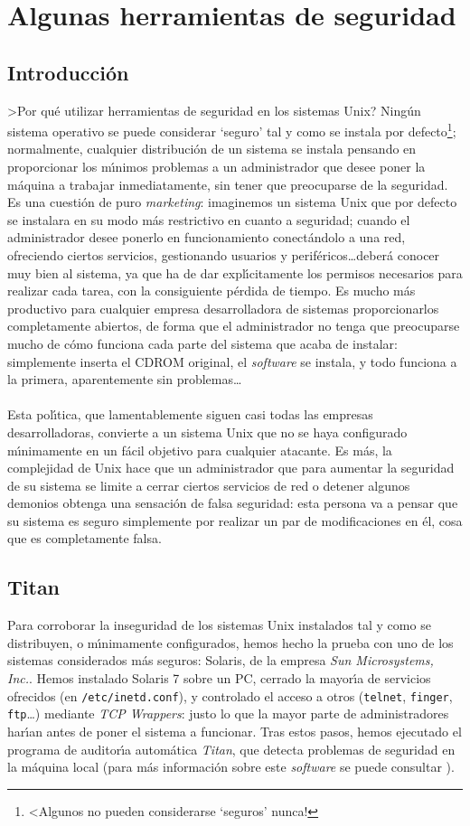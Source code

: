 \chapter{Algunas herramientas de seguridad}
\section{Introducci\'on}
>Por qu\'e utilizar herramientas de seguridad en los sistemas Unix? Ning\'un
sistema operativo se puede considerar `seguro' tal y como se instala por 
defecto\footnote{<Algunos no pueden considerarse `seguros' nunca!}; 
normalmente, cualquier distribuci\'on de un sistema se instala pensando en
proporcionar los m\'{\i}nimos problemas a un administrador que desee poner
la m\'aquina a trabajar inmediatamente, sin tener que preocuparse de la 
seguridad. Es una cuesti\'on de puro {\it marketing}: imaginemos un sistema
Unix que por defecto se instalara en su modo m\'as restrictivo en cuanto a
seguridad; cuando el administrador desee ponerlo en funcionamiento 
conect\'andolo a una red, ofreciendo ciertos servicios, gestionando usuarios y 
perif\'ericos\ldots deber\'a conocer muy bien al sistema, ya que ha de dar
expl\'{\i}citamente los permisos necesarios para realizar cada tarea, con la 
consiguiente p\'erdida de tiempo. Es mucho m\'as productivo para cualquier
empresa desarrolladora de sistemas proporcionarlos completamente abiertos, de 
forma que el administrador no tenga que preocuparse mucho de c\'omo funciona 
cada parte del sistema que acaba de instalar: simplemente inserta el CDROM 
original, el {\it software} se instala, y todo funciona a la primera, 
aparentemente sin problemas\ldots\\
\\Esta pol\'{\i}tica, que lamentablemente siguen casi todas las empresas 
desarrolladoras, convierte a un sistema Unix que no se haya configurado 
m\'{\i}nimamente en un f\'acil objetivo para cualquier atacante. Es m\'as, la
complejidad de Unix hace que un administrador que para aumentar la seguridad de 
su sistema se limite a cerrar ciertos servicios de red o detener algunos
demonios obtenga una sensaci\'on de falsa seguridad: esta persona va a pensar
que su sistema es seguro simplemente por realizar un par de modificaciones en
\'el, cosa que es completamente falsa.
\section{Titan}
Para corroborar la inseguridad de los sistemas Unix instalados tal y como se
distribuyen, o m\'{\i}\-ni\-ma\-men\-te configurados, hemos hecho la prueba con uno de
los sistemas considerados m\'as seguros: Solaris, de la empresa {\it Sun
Microsystems, Inc.}. Hemos instalado Solaris 7 sobre un PC, cerrado la 
mayor\'{\i}a de servicios ofrecidos (en {\tt /etc/inetd.conf}), y controlado el
acceso a otros ({\tt telnet}, {\tt finger}, {\tt ftp}\ldots) mediante 
{\it TCP Wrappers}: justo lo que la mayor parte de administradores har\'{\i}an
antes de poner el sistema a funcionar. Tras estos pasos, hemos ejecutado el
programa de auditor\'{\i}a autom\'atica {\it Titan}, que detecta problemas de
seguridad en la m\'aquina local (para m\'as informaci\'on sobre este {\it 
software} se puede consultar \cite{kn:tit98}).
